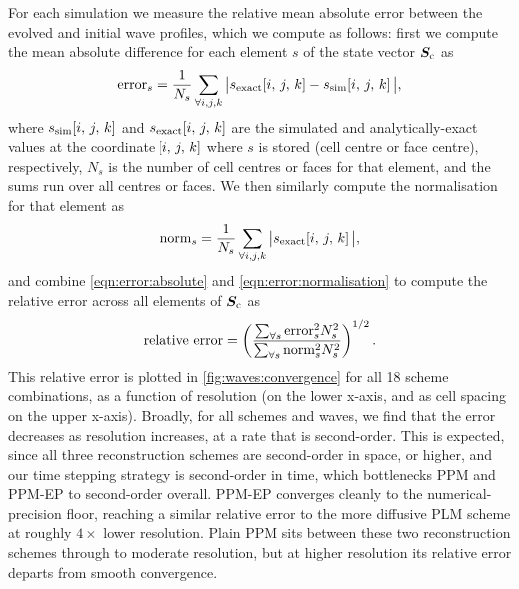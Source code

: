 For each simulation we measure the relative mean absolute error between the evolved and initial wave profiles, which we compute as follows: first we compute the mean absolute difference for each element $s$ of the state vector $\bm{S}_\mathrm{c}$ as
\begin{align}
    \mbox{error}_s
        = \frac{1}{N_s} \sum_{\forall i, j, k} \big|
            s_\mathrm{exact}\!\left[ i,\,j,\,k \right]
            - s_\mathrm{sim}\!\left[ i,\,j,\,k \right]
        \big|
    , \label{eqn:error:absolute}
\end{align}
where $s_\mathrm{sim}\!\left[ i,\,j,\,k \right]$ and $s_\mathrm{exact}\!\left[ i,\,j,\,k \right]$ are the simulated and analytically-exact values at the coordinate $\!\left[ i,\,j,\,k \right]$ where $s$ is stored (cell centre or face centre), respectively, $N_s$ is the number of cell centres or faces for that element, and the sums run over all centres or faces. We then similarly compute the normalisation for that element as
\begin{align}
    \mbox{norm}_s
        = \frac{1}{N_s} \sum_{\forall i, j, k} \big|
            s_\mathrm{exact}\!\left[ i,\,j,\,k \right]
        \big|
    , \label{eqn:error:normalisation}
\end{align}
and combine \cref{eqn:error:absolute} and \cref{eqn:error:normalisation} to compute the relative error across all elements of $\bm{S}_\mathrm{c}$ as
\begin{align}
    \mbox{relative error}
        = \left( \frac{
                    \sum_{\forall s} \mbox{error}_s^2 N_s^2
                }{
                    \sum_{\forall s} \mbox{norm}_s^2 N_s^2
            } \right)^{1/2}
    . \label{eqn:error:relative}
\end{align}
This relative error is plotted in \cref{fig:waves:convergence} for all 18 scheme combinations, as a function of resolution (on the lower x-axis, and as cell spacing on the upper x-axis). Broadly, for all schemes and waves, we find that the error decreases as resolution increases, at a rate that is second-order. This is expected, since all three reconstruction schemes are second-order in space, or higher, and our time stepping strategy is second-order in time, which bottlenecks PPM and PPM-EP to second-order overall. PPM-EP converges cleanly to the numerical-precision floor, reaching a similar relative error to the more diffusive PLM scheme at roughly $4\times$ lower resolution. Plain PPM sits between these two reconstruction schemes through to moderate resolution, but at higher resolution its relative error departs from smooth convergence.

